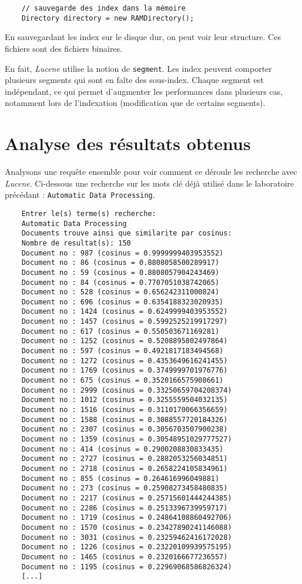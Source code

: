 \documentclass[a4paper, 11pt]{article}
\begin{document}
{\begin{verbatim}
	// sauvegarde des index dans la mémoire
	Directory directory = new RAMDirectory();
\end{verbatim}

En sauvegardant les index sur le disque dur, on peut voir leur structure. Ces fichiers sont des fichiers binaires. 

En fait, \emph{Lucene} utilise la notion de \texttt{segment}. Les index peuvent comporter plusieurs segments qui sont en faîte des sous-index. Chaque segment est indépendant, ce qui permet d'augmenter les performances dans plusieurs cas, notamment lors de l'indexation (modification que de certains segments).

\section{Analyse des résultats obtenus} 
	
Analysons une requête ensemble pour voir comment ce déroule les recherche avec \emph{Lucene}. Ci-dessous une recherche sur les mots clé déjà utilisé dans le laboratoire précédant : \texttt{Automatic Data Processing}.

\begin{verbatim}
	Entrer le(s) terme(s) recherche:
	Automatic Data Processing
	Documents trouve ainsi que similarite par cosinus:
	Nombre de resultat(s): 150
	Document no : 987 (cosinus = 0.9999999403953552)
	Document no : 86 (cosinus = 0.8808058500289917)
	Document no : 59 (cosinus = 0.8808057904243469)
	Document no : 84 (cosinus = 0.7707051038742065)
	Document no : 528 (cosinus = 0.656242311000824)
	Document no : 696 (cosinus = 0.6354188323020935)
	Document no : 1424 (cosinus = 0.6249999403953552)
	Document no : 1457 (cosinus = 0.5992525219917297)
	Document no : 617 (cosinus = 0.550503671169281)
	Document no : 1252 (cosinus = 0.5208895802497864)
	Document no : 597 (cosinus = 0.4921817183494568)
	Document no : 1272 (cosinus = 0.4353649616241455)
	Document no : 1769 (cosinus = 0.3749999701976776)
	Document no : 675 (cosinus = 0.3520166575908661)
	Document no : 2999 (cosinus = 0.33250659704208374)
	Document no : 1012 (cosinus = 0.3255559504032135)
	Document no : 1516 (cosinus = 0.3110170066356659)
	Document no : 1588 (cosinus = 0.3088557720184326)
	Document no : 2307 (cosinus = 0.3056703507900238)
	Document no : 1359 (cosinus = 0.30548951029777527)
	Document no : 414 (cosinus = 0.2900208830833435)
	Document no : 2727 (cosinus = 0.2882053256034851)
	Document no : 2718 (cosinus = 0.2658224105834961)
	Document no : 855 (cosinus = 0.264616996049881)
	Document no : 273 (cosinus = 0.25908273458480835)
	Document no : 2217 (cosinus = 0.25715601444244385)
	Document no : 2286 (cosinus = 0.2513396739959717)
	Document no : 1719 (cosinus = 0.24864108860492706)
	Document no : 1570 (cosinus = 0.23427890241146088)
	Document no : 3031 (cosinus = 0.23259462416172028)
	Document no : 1226 (cosinus = 0.23220109939575195)
	Document no : 1465 (cosinus = 0.2320166677236557)
	Document no : 1195 (cosinus = 0.22969068586826324)
	[...]
\end{verbatim}	

}
\end{document}

